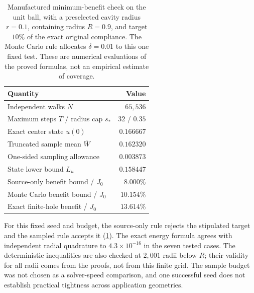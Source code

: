 \begin{table}[t]
\centering
\small
\caption{Manufactured minimum-benefit check on the unit ball, with a
preselected cavity radius $r=0.1$, containing radius $R=0.9$, and target
$10\%$ of the exact original compliance. The Monte Carlo rule allocates
$\delta=0.01$ to this one fixed test. These are numerical evaluations of
the proved formulas, not an empirical estimate of coverage.}
\label{tab:minimumbenefitcheck}
\begin{tabular}{lr}
\toprule
Quantity & Value\\
\midrule
Independent walks $N$ & $65{,}536$\\
Maximum steps $T$ / radius cap $s_*$ & $32$ / $0.35$\\
Exact center state $u(0)$ & $0.166667$\\
Truncated sample mean $\overline W$ & $0.162320$\\
One-sided sampling allowance & $0.003873$\\
State lower bound $L_u$ & $0.158447$\\
Source-only benefit bound / $J_0$ & $8.000\%$\\
Monte Carlo benefit bound / $J_0$ & $10.154\%$\\
Exact finite-hole benefit / $J_0$ & $13.614\%$\\
\bottomrule
\end{tabular}
\end{table}

For this fixed seed and budget, the source-only rule rejects the stipulated
target and the sampled rule accepts it (\cref{tab:minimumbenefitcheck}).
The exact energy formula agrees with independent radial quadrature to
$4.3\times10^{-16}$ in the seven tested cases. The deterministic inequalities
are also checked at $2{,}001$ radii below $R$; their validity for all radii
comes from the proofs, not from this finite grid. The sample budget was not
chosen as a solver-speed comparison, and one successful seed does not
establish practical tightness across application geometries.
